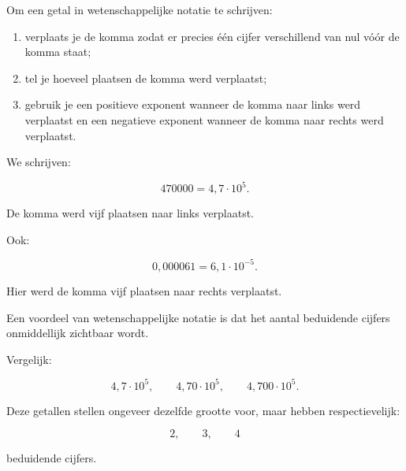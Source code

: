 \documentclass{ximera}
\begin{document}

Om een getal in wetenschappelijke notatie te schrijven:

\begin{enumerate}
    \item verplaats je de komma zodat er precies één cijfer verschillend van
    nul vóór de komma staat;

    \item tel je hoeveel plaatsen de komma werd verplaatst;

    \item gebruik je een positieve exponent wanneer de komma naar links werd
    verplaatst en een negatieve exponent wanneer de komma naar rechts werd
    verplaatst.
\end{enumerate}


\begin{voorbeeld}

We schrijven:

\[
470000
=
4{,}7 \cdot 10^5.
\]

De komma werd vijf plaatsen naar links verplaatst.

Ook:

\[
0{,}000061
=
6{,}1 \cdot 10^{-5}.
\]

Hier werd de komma vijf plaatsen naar rechts verplaatst.

\end{voorbeeld}



Een voordeel van wetenschappelijke notatie is dat het aantal beduidende cijfers
onmiddellijk zichtbaar wordt.

\begin{voorbeeld}

Vergelijk:

\[
4{,}7 \cdot 10^5,
\qquad
4{,}70 \cdot 10^5,
\qquad
4{,}700 \cdot 10^5.
\]

Deze getallen stellen ongeveer dezelfde grootte voor, maar hebben
respectievelijk:

\[
2,\qquad 3,\qquad 4
\]

beduidende cijfers.

\end{voorbeeld}


\end{document}
